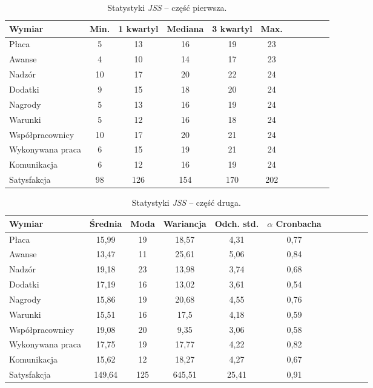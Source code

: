 \begin{table}[h!]
\begin{center}
\begin{tabular}{l | c c c c c c c c c c}
Wymiar & Min. & 1 kwartyl & Mediana & 3 kwartyl & Max.\\ \hline \hline
Płaca & 5 & 13 & 16 & 19 & 23 \\ 
Awanse & 4 & 10 & 14 & 17 & 23 \\
Nadzór & 10 & 17 & 20 & 22 & 24 \\
Dodatki & 9 & 15 & 18 & 20 & 24 \\
Nagrody & 5 & 13 & 16 & 19 & 24 \\
Warunki & 5 & 12 & 16 & 18 & 24 \\
Współpracownicy & 10 & 17 & 20 & 21 & 24 \\
Wykonywana praca & 6 & 15 & 19 & 21 & 24 \\
Komunikacja & 6 & 12 & 16 & 19 & 24 \\ \hline
Satysfakcja & 98 & 126 & 154 & 170 & 202 \\ \hline
\end{tabular}
\end{center}
\caption{Statystyki \emph{JSS} -- część pierwsza.}
\label{tab:jss-stats-1}
\end{table}

\begin{table}[h!]
\begin{center}
\begin{tabular}{l | c c c c c c c c c c}
Wymiar & Średnia & Moda & Wariancja & Odch. std. & $\alpha$ Cronbacha\\ \hline \hline
Płaca & 15,99 & 19 & 18,57 & 4,31 & 0,77 \\
Awanse & 13,47 & 11 & 25,61 & 5,06 & 0,84 \\
Nadzór & 19,18 & 23 & 13,98 & 3,74 & 0,68 \\
Dodatki & 17,19 & 16 & 13,02 & 3,61 & 0,54 \\
Nagrody & 15,86 & 19 & 20,68 & 4,55 & 0,76 \\
Warunki & 15,51 & 16 & 17,5 & 4,18 & 0,59 \\
Współpracownicy & 19,08 & 20 & 9,35 & 3,06 & 0,58 \\
Wykonywana praca & 17,75 & 19 & 17,77 & 4,22 & 0,82 \\
Komunikacja & 15,62 & 12 & 18,27 & 4,27 & 0,67 \\ \hline
Satysfakcja & 149,64 & 125 & 645,51 & 25,41 & 0,91 \\ \hline
\end{tabular}
\end{center}
\caption{Statystyki \emph{JSS} -- część druga.}
\label{tab:jss-stats-2}
\end{table}

